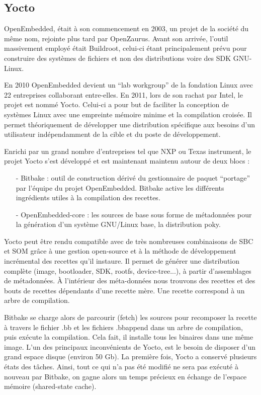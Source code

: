 \subsection{Yocto}

OpenEmbedded, était à son commencement en 2003, un projet de la société du même
nom, rejointe plus tard par OpenZaurus. Avant son arrivée, l'outil massivement employé
était Buildroot, celui-ci étant principalement prévu pour construire des systèmes de fichiers
et non des distributions voire des SDK GNU-Linux. \medskip

En 2010 OpenEmbedded devient un “lab workgroup” de la fondation Linux avec 22
entreprises collaborant entre-elles. En 2011, lors de son rachat par Intel, le projet est
nommé Yocto. Celui-ci a pour but de faciliter la conception de systèmes Linux avec une
empreinte mémoire minime et la compilation croisée. Il permet théoriquement de
développer une distribution spécifique aux besoins d’un utilisateur indépendamment de la
cible et du poste de développement. \medskip

\clearpage

Enrichi par un grand nombre d’entreprises tel que NXP ou Texas instrument, le projet
Yocto s’est développé et est maintenant maintenu autour de deux blocs :

\begin{itemize}
    \item[-] Bitbake : outil de construction dérivé du gestionnaire de paquet “portage” par
    l’équipe du projet OpenEmbedded. Bitbake active les différents ingrédients utiles à
    la compilation des recettes.
    \item[-] OpenEmbedded-core : les sources de base sous forme de métadonnées pour la
    génération d’un système GNU/Linux base, la distribution poky.
\end{itemize}

Yocto peut être rendu compatible avec de très nombreuses combinaisons de SBC et SOM
grâce à une gestion open-source et à la méthode de développement incrémental des
recettes qu’il instaure. Il permet de générer une distribution complète (image, bootloader,
SDK, rootfs, device-tree...), à partir d’assemblages de métadonnées. À l’intérieur des
méta-données nous trouvons des recettes et des bouts de recettes dépendants d’une
recette mère. Une recette correspond à un arbre de compilation. \medskip

Bitbake se charge alors de parcourir (fetch) les sources pour recomposer la recette à travers le 
fichier .bb et les fichiers .bbappend dans un arbre de compilation, puis exécute la compilation.
Cela fait,  il installe tous les binaires dans une même image. L’un des principaux inconvénients de
Yocto, est le besoin de disposer d’un grand espace disque (environ 50 Gb). La première fois, Yocto
a conservé  plusieurs états des tâches. Ainsi, tout ce qui n’a pas été modifié ne sera pas exécuté
à nouveau par Bitbake, on gagne alors un temps précieux en échange de l’espace mémoire
(shared-state cache).

